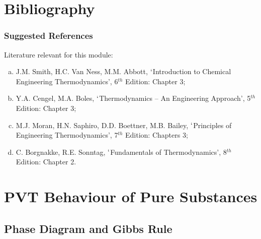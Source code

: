 \documentclass[10pt,compress]{beamer}
\begin{document}
\section{Bibliography}
\begin{frame}
 \frametitle{Suggested References}
  Literature relevant for this module:
  \begin{enumerate}[(a)]
   \item J.M. Smith, H.C. Van Ness, M.M. Abbott, $\lq$Introduction to Chemical Engineering Thermodynamics', 6$^{th}$ Edition: Chapter 3;
   \item Y.A. Cengel, M.A. Boles, $\lq$Thermodynamics -- An Engineering Approach', 5$^{th}$ Edition: Chapter 3; 
   \item M.J. Moran, H.N. Saphiro, D.D. Boettner, M.B. Bailey, $\lq$Principles of Engineering Thermodynamics', 7$^{th}$ Edition: Chapters 3;
   \item C. Borgnakke, R.E. Sonntag, $\lq$Fundamentals of Thermodynamics', 8$^{th}$ Edition: Chapter 2.
  \end{enumerate}
\end{frame}



\section{PVT Behaviour of Pure Substances}

\subsection{Phase Diagram and Gibbs Rule} 
\end{document}

